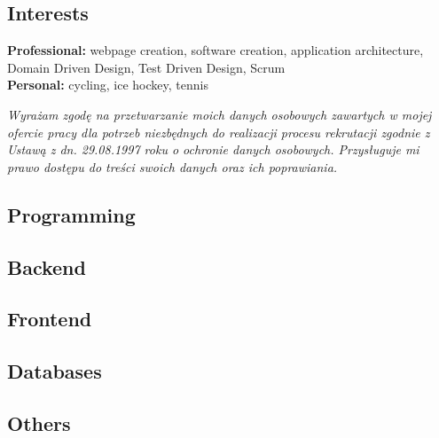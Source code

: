 \documentclass[]{friggeri-cv} %
\begin{document}
	\begin{absolutelynopagebreak}
		\section{Interests}
		\textbf{Professional: } webpage creation, software creation, application architecture, Domain Driven Design, Test Driven Design, Scrum\\
		\textbf{Personal: } cycling, ice hockey, tennis
	\end{absolutelynopagebreak}
	
	\vfill
	\textit{Wyrażam zgodę na przetwarzanie moich danych osobowych zawartych w mojej ofercie pracy dla potrzeb niezbędnych do realizacji procesu rekrutacji zgodnie z Ustawą z dn. 29.08.1997 roku o ochronie danych osobowych. Przysługuje mi prawo dostępu do treści swoich danych oraz ich poprawiania.}
	
	\begin{pside}
		\section{Programming}
		\subsection{Backend}
		
		\subsection{Frontend}
		
		\subsection{Databases}
		
		\subsection{Others}
	\end{pside}
\end{document}
